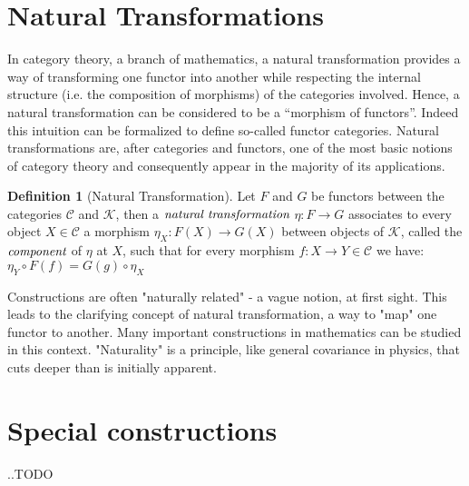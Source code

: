 \documentclass[10pt, oneside, reqno]{amsart}
\theoremstyle{plain}%
\theoremstyle{definition}
\newtheorem{defn}[thm]{Definition}
\theoremstyle{remark}
\begin{document}
\section{Natural Transformations} %
\label{sec:natural transformations}
In category theory, a branch of mathematics, a natural transformation provides a way of transforming one functor into another
while respecting the internal structure (i.e. the composition of morphisms) of the categories involved.
Hence, a natural transformation can be considered to be a ``morphism of functors''.
Indeed this intuition can be formalized to define so-called functor categories.
Natural transformations are, after categories and functors, one of the most basic notions of category theory and consequently
appear in the majority of its applications.

\begin{defn}[Natural Transformation]
	Let $F$ and $G$ be functors between the categories $\mathcal{C}$ and $\mathcal{K}$, then a $\emph{natural transformation}$ $\eta : F \to G$
	associates to every object $X \in \mathcal{C}$ a morphism $\eta_{X} : F(X) \to G(X)$ between objects of $\mathcal{K}$, called the $\emph{component}$
	of $\eta$ at $X$, such that for every morphism $f : X \to Y \in \mathcal{C}$ we have:
	\\
	$\eta_{Y} \circ F(f) = G(g) \circ \eta_{X}$
\end{defn}
Constructions are often "naturally related" - a vague notion, at first sight.
This leads to the clarifying concept of natural transformation, a way to "map" one functor to another.
Many important constructions in mathematics can be studied in this context.
"Naturality" is a principle, like general covariance in physics, that cuts deeper than is initially apparent.


\section{Special constructions} %
\label{sec:special constructions}
..TODO
\end{document}
